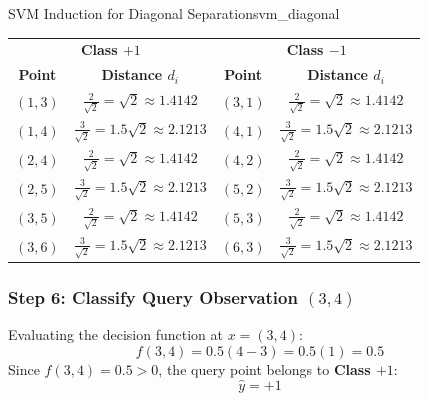 \begin{example}{SVM Induction for Diagonal Separation}{svm_diagonal}
\begin{center}\small
\begin{tabular}{cc|cc}
\toprule
\multicolumn{2}{c|}{\textbf{Class $+1$}} & \multicolumn{2}{c}{\textbf{Class $-1$}} \\
\textbf{Point} & \textbf{Distance $d_i$} & \textbf{Point} & \textbf{Distance $d_i$} \\
\midrule
$(1, 3)$ & $\frac{2}{\sqrt{2}} = \sqrt{2} \approx 1.4142$ & $(3, 1)$ & $\frac{2}{\sqrt{2}} = \sqrt{2} \approx 1.4142$ \\
$(1, 4)$ & $\frac{3}{\sqrt{2}} = 1.5\sqrt{2} \approx 2.1213$ & $(4, 1)$ & $\frac{3}{\sqrt{2}} = 1.5\sqrt{2} \approx 2.1213$ \\
$(2, 4)$ & $\frac{2}{\sqrt{2}} = \sqrt{2} \approx 1.4142$ & $(4, 2)$ & $\frac{2}{\sqrt{2}} = \sqrt{2} \approx 1.4142$ \\
$(2, 5)$ & $\frac{3}{\sqrt{2}} = 1.5\sqrt{2} \approx 2.1213$ & $(5, 2)$ & $\frac{3}{\sqrt{2}} = 1.5\sqrt{2} \approx 2.1213$ \\
$(3, 5)$ & $\frac{2}{\sqrt{2}} = \sqrt{2} \approx 1.4142$ & $(5, 3)$ & $\frac{2}{\sqrt{2}} = \sqrt{2} \approx 1.4142$ \\
$(3, 6)$ & $\frac{3}{\sqrt{2}} = 1.5\sqrt{2} \approx 2.1213$ & $(6, 3)$ & $\frac{3}{\sqrt{2}} = 1.5\sqrt{2} \approx 2.1213$ \\
\bottomrule
\end{tabular}
\end{center}

\subsubsection{Step 6: Classify Query Observation \texorpdfstring{$(3, 4)$}{(3, 4)}}
Evaluating the decision function at $x = (3, 4)$:
\begin{equation}
f(3, 4) = 0.5(4 - 3) = 0.5(1) = 0.5
\end{equation}
Since $f(3, 4) = 0.5 > 0$, the query point belongs to \textbf{Class $+1$}:
\begin{equation}
\hat{y} = +1
\end{equation}

\begin{center}
\end{center}
\end{example}
